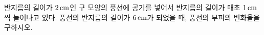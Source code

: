 반지름의 길이가 $2\mkern3mu \mathrm{cm}$인 구 모양의 풍선에 공기를 넣어서 반지름의 길이가 매초 $1\mkern3mu \mathrm{cm}$씩 늘어나고 있다. 풍선의 반지름의 길이가 $6\mkern3mu \mathrm{cm}$가 되었을 때, 풍선의 부피의 변화율을 구하시오. 
